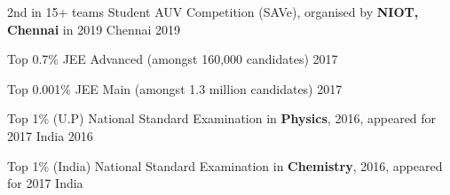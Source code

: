 \begin{cvhonors}

  \cvhonor
    {2nd in 15+ teams}
    {Student AUV Competition (SAVe), \break organised by\textbf{ NIOT, Chennai} in 2019} 
    {Chennai} 
    {2019}
 
  \cvhonor
  {Top 0.7\%}
  {JEE Advanced (amongst 160,000 candidates)}
  {}
  {2017}

  \cvhonor
  {Top 0.001\%}
  {JEE Main (amongst 1.3 million candidates)}
  {}
  {2017}
  
  \cvhonor
  {Top 1\% (U.P)}
  {National Standard Examination in \textbf{Physics}, 2016, appeared for  2017}
  {India}
  {2016}
 
  \cvhonor
  {Top 1\% (India)} 
  {National Standard Examination in \textbf{Chemistry}, 2016, appeared for  2017}
  {India}
  {}

\end{cvhonors}

